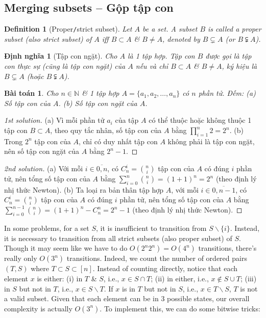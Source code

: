 \documentclass{article}
\newtheorem{baitoan}{Bài toán}
\newtheorem{definition}{Definition}
\newtheorem{dinhnghia}{Định nghĩa}
\begin{document}

\subsection{Merging subsets -- Gộp tập con}

\begin{definition}[Proper{\tt/}strict subset]
    Let $A$ be a set. A subset $B$ is called a {\rm proper subset} (also {\rm strict subset}) of $A$ iff $B\subset A$ \& $B\ne A$, denoted by $B\subsetneq A$ (or $B\subsetneqq A$).
\end{definition}

\begin{dinhnghia}[Tập con ngặt]
    Cho $A$ là 1 tập hợp. Tập con $B$ được gọi là {\rm tập con thực sự} (cũng là {\rm tập con ngặt}) của $A$ nếu và chỉ $B\subset A$ \& $B\ne A$, ký hiệu là $B\subsetneq A$ (hoặc $B\subsetneqq A$).
\end{dinhnghia}

\begin{baitoan}
    Cho $n\in\mathbb{N}$ \& 1 tập hợp $A = \{a_1,a_2,\ldots,a_n\}$ có $n$ phần tử. Đếm: (a) Số tập con của $A$. (b) Số tập con ngặt của $A$.
\end{baitoan}

\begin{proof}[1st solution]
    (a) Vì mỗi phần tử $a_i$ của tập $A$ có thể thuộc hoặc không thuộc 1 tập con $B\subset A$, theo quy tắc nhân, số tập con của $A$ bằng $\prod_{i=1}^n 2 = 2^n$. (b) Trong $2^n$ tập con của $A$, chỉ có duy nhất tập con $A$ không phải là tập con ngặt, nên số tập con ngặt của $A$ bằng $2^n - 1$.
\end{proof}

\begin{proof}[2nd solution]
    (a) Với mỗi $i\in\overline{0,n}$, có $C_n^i = \binom{n}{i}$ tập con của $A$ có đúng $i$ phần tử, nên tổng số tập con của $A$ bằng $\sum_{i=0}^n \binom{n}{i} = (1 + 1)^n = 2^n$ (theo định lý nhị thức Newton). (b) Ta loại ra bản thân tập hợp $A$, với mỗi $i\in\overline{0,n - 1}$, có $C_n^i = \binom{n}{i}$ tập con của $A$ có đúng $i$ phần tử, nên tổng số tập con của $A$ bằng $\sum_{i=0}^{n-1} \binom{n}{i} = (1 + 1)^n - C_n^n = 2^n - 1$ (theo định lý nhị thức Newton).
\end{proof}
In some problems, for a set $S$, it is insufficient to transition from $S\backslash\{i\}$. Instead, it is necessary to transition from all strict subsets (also proper subset) of $S$. Though it may seem like we have to do $O(2^n2^n) = O(4^n)$ transitions, there's really only $O(3^n)$ transitions. Indeed, we count the number of ordered pairs $(T,S)$ where $T\subset S\subset[n]$. Instead of counting directly, notice that each element $x$ is either: (i) in $T$ \& $S$, i.e., $x\in S\cap T$; (ii) in either, i.e., $x\notin S\cup T$; (iii) in $S$ but not in $T$, i.e., $x\in S\backslash T$. If $x$ is in $T$ but not in $S$, i.e., $x\in T\backslash S$, $T$ is not a valid subset. Given that each element can be in 3 possible states, our overall complexity is actually $O(3^n)$. To implement this, we can do some bitwise tricks:
\end{document}
